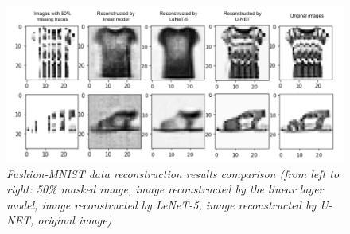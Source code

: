 \begin{figure}[H]
    \centering
    \includegraphics[width=\textwidth]{Figure/Front_page/fmnist reconstruction.png}
    \caption{\textit{Fashion-MNIST data reconstruction results comparison (from left to right: 50\% masked image, image reconstructed by the linear layer model, image reconstructed by LeNeT-5, image reconstructed by U-NET, original image)}}
    \label{fig:fmnist}
\end{figure}

